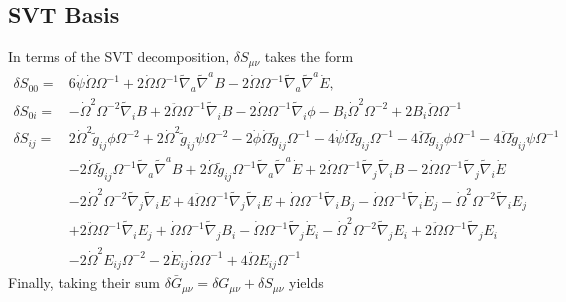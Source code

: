 \documentclass[10pt,letterpaper]{article}
\numberwithin{equation}{section}
\begin{document}
\subsection{SVT Basis}
In terms of the SVT decomposition,
$\delta S_{\mu\nu}$ takes the form 
\begin{align}
\delta S_{00}={}&6 \dot{\psi} \dot{\Omega} \Omega^{-1}
 + 2 \dot{\Omega} \Omega^{-1} \tilde\nabla_{a}\tilde\nabla^{a}B
 - 2 \dot{\Omega} \Omega^{-1} \tilde\nabla_{a}\tilde\nabla^{a}\dot{E},
\nonumber\\
\delta S_{0i}={}&- \dot{\Omega}^2 \Omega^{-2} \tilde\nabla_{i}B
 + 2 \ddot{\Omega} \Omega^{-1} \tilde\nabla_{i}B
 - 2 \dot{\Omega} \Omega^{-1} \tilde\nabla_{i}\phi
- B_{i} \dot{\Omega}^2 \Omega^{-2}
 + 2 B_{i} \ddot{\Omega} \Omega^{-1}
\nonumber\\
\delta S_{ij}={}&2 \dot{\Omega}^2 \tilde g_{ij} \phi \Omega^{-2}
 + 2 \dot{\Omega}^2 \tilde g_{ij} \psi \Omega^{-2}
 - 2 \dot{\phi} \dot{\Omega} \tilde g_{ij} \Omega^{-1}
 - 4 \dot{\psi} \dot{\Omega} \tilde g_{ij} \Omega^{-1}
 - 4 \ddot{\Omega} \tilde g_{ij} \phi \Omega^{-1}
 - 4 \ddot{\Omega} \tilde g_{ij} \psi \Omega^{-1}\nonumber\\
& - 2 \dot{\Omega} \tilde g_{ij} \Omega^{-1} \tilde\nabla_{a}\tilde\nabla^{a}B
 + 2 \dot{\Omega} \tilde g_{ij} \Omega^{-1} \tilde\nabla_{a}\tilde\nabla^{a}\dot{E}
 + 2 \dot{\Omega} \Omega^{-1} \tilde\nabla_{j}\tilde\nabla_{i}B
 - 2 \dot{\Omega} \Omega^{-1} \tilde\nabla_{j}\tilde\nabla_{i}\dot{E}\nonumber\\
& - 2 \dot{\Omega}^2 \Omega^{-2} \tilde\nabla_{j}\tilde\nabla_{i}E
 + 4 \ddot{\Omega} \Omega^{-1} \tilde\nabla_{j}\tilde\nabla_{i}E
+ \dot{\Omega} \Omega^{-1} \tilde\nabla_{i}B_{j}
 -  \dot{\Omega} \Omega^{-1} \tilde\nabla_{i}\dot{E}_{j}
 -  \dot{\Omega}^2 \Omega^{-2} \tilde\nabla_{i}E_{j}
\nonumber\\
& + 2 \ddot{\Omega} \Omega^{-1} \tilde\nabla_{i}E_{j}
 + \dot{\Omega} \Omega^{-1} \tilde\nabla_{j}B_{i}
 -  \dot{\Omega} \Omega^{-1} \tilde\nabla_{j}\dot{E}_{i}
 -  \dot{\Omega}^2 \Omega^{-2} \tilde\nabla_{j}E_{i}
 + 2 \ddot{\Omega} \Omega^{-1} \tilde\nabla_{j}E_{i}
\nonumber\\
&-2 \dot{\Omega}^2 E_{ij} \Omega^{-2}
 - 2 \dot{E}_{ij} \dot{\Omega} \Omega^{-1}
 + 4 \ddot{\Omega} E_{ij} \Omega^{-1}
\end{align}
Finally, taking their sum $\delta \bar G_{\mu\nu} = \delta G_{\mu\nu} + \delta S_{\mu\nu}$ yields 
\end{document}

